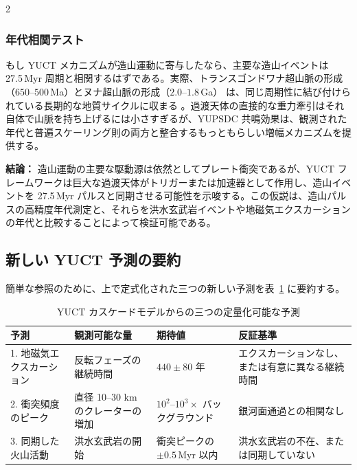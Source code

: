 \documentclass[12pt,a4paper]{article}
\begin{document}
\begin{multicols}{2}
		\subsubsection{年代相関テスト}
		もし YUCT メカニズムが造山運動に寄与したなら、主要な造山イベントは 27.5 Myr 周期と相関するはずである。実際、トランスゴンドワナ超山脈の形成（\(650\)–\(500\) Ma）とヌナ超山脈の形成（\(2.0\)–\(1.8\) Ga）\cite{CampbellAllen2008} は、同じ周期性に結び付けられている長期的な地質サイクルに収まる \cite{Rampino2021}。過渡天体の直接的な重力牽引はそれ自体で山脈を持ち上げるには小さすぎるが、YUPSDC 共鳴効果は、観測された年代と普遍スケーリング則の両方と整合するもっともらしい増幅メカニズムを提供する。
		
		\vspace{0.3cm}
		\noindent
		\textbf{結論：} 造山運動の主要な駆動源は依然としてプレート衝突であるが、YUCT フレームワークは巨大な過渡天体がトリガーまたは加速器として作用し、造山イベントを 27.5 Myr パルスと同期させる可能性を示唆する。この仮説は、造山パルスの高精度年代測定と、それらを洪水玄武岩イベントや地磁気エクスカーションの年代と比較することによって検証可能である。
		
	\end{multicols}
	
	\subsection{新しい YUCT 予測の要約}
	簡単な参照のために、上で定式化された三つの新しい予測を表~\ref{tab:new_predictions} に要約する。
	
	\begin{table}[H]
		\centering
		\small
		\caption{YUCT カスケードモデルからの三つの定量化可能な予測}
		\label{tab:new_predictions}
		\begin{tabular}{p{3.9cm} p{4.4cm} p{4.7cm} p{4.0cm}}
			\toprule
			\textbf{予測} & \textbf{観測可能な量} & \textbf{期待値} & \textbf{反証基準} \\
			\midrule
			1. 地磁気エクスカーション & 反転フェーズの継続時間 & \(440 \pm 80\) 年 & エクスカーションなし、または有意に異なる継続時間 \\
			2. 衝突頻度のピーク & 直径 10–30 km のクレーターの増加 & \(10^{2}\)–\(10^{3}\times\) バックグラウンド & 銀河面通過との相関なし \\
			3. 同期した火山活動 & 洪水玄武岩の開始 & 衝突ピークの \(\pm 0.5\) Myr 以内 & 洪水玄武岩の不在、または同期していない \\
			\bottomrule
		\end{tabular}
	\end{table}
	
\end{document}
